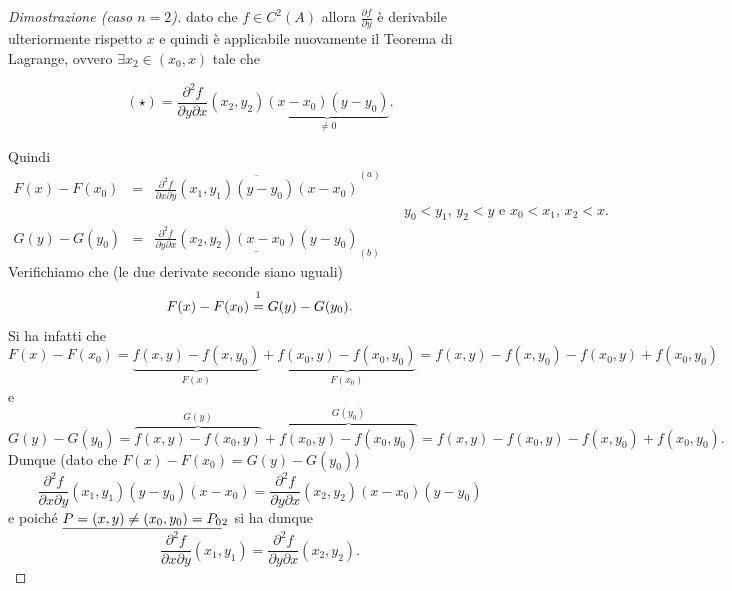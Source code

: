 \begin{proof}[Dimostrazione (caso $n=2$)]
	dato che $f\in C^2(A)$ allora $\frac{\partial f}{\partial y}$ è derivabile ulteriormente rispetto $x$ e quindi è applicabile nuovamente il Teorema di Lagrange, ovvero $\exists x_2\in(x_0, x)$ tale che
	
	\begin{equation*}
		(\star) =  \frac{\partial^2 f}{\partial y\partial x}(x_2,y_2)\underbrace{(x-x_0)(y-y_0)}_{\neq 0}.
	\end{equation*}
	
	Quindi
	\begin{equation}\label{eq:derivate_dim_schwartz}
		\begin{matrix}
			F(x) - F(x_0) &=& \overline{\frac{\partial^2 f}{\partial x\partial y}(x_1,y_1)(y-y_0)(x-x_0)}^{(a)}\\
			&&&&y_0<y_1,\, y_2 < y \text{ e } x_0<x_1,\, x_2 < x.\\
			G(y) - G(y_0) &=&\underline{ \frac{\partial^2 f}{\partial y\partial x}(x_2,y_2)(x-x_0)(y-y_0)}_{(b)}
		\end{matrix}
	\end{equation}
	Verifichiamo che (le due derivate seconde siano uguali)
	\begin{equation*}
		F(x) - F(x_0) \overset{\footnotemark}{=} G(y) - G(y_0).
	\end{equation*}
	Si ha infatti che
	\begin{equation*}
		F(x) - F(x_0) = \underbrace{f(x,y) - f(x, y_0)}_{F(x)} + \underbrace{f(x_0,y) - f(x_0,y_0)}_{F(x_0)} = f(x,y) - f(x, y_0) - f(x_0, y) + f(x_0,y_0)
	\end{equation*}
	e
	\begin{equation*}
		G(y) - G(y_0) = \overbrace{f(x,y) - f(x_0, y)}^{G(y)} + \overbrace{f(x_0,y) - f(x_0,y_0)}^{G(y_0)} = f(x,y) - f(x_0, y) - f(x, y_0) + f(x_0,y_0).
	\end{equation*}
	Dunque (dato che $F(x) - F(x_0) = G(y) - G(y_0)$)
	\begin{equation*}
		 \frac{\partial^2 f}{\partial x\partial y}(x_1,y_1)(y-y_0)(x-x_0) = \frac{\partial^2 f}{\partial y\partial x}(x_2,y_2)(x-x_0)(y-y_0)
	\end{equation*}
	e poiché $\uline{P=(x,y)\neq(x_0,y_0)=P_0}_{\footnotemark}$ si ha dunque
	\begin{equation}\label{eq:derivate_miste_dim_schwarz}
		\frac{\partial^2 f}{\partial x\partial y}(x_1,y_1) =  \frac{\partial^2 f}{\partial y\partial x}(x_2,y_2).
	\end{equation}
	

\end{proof}
